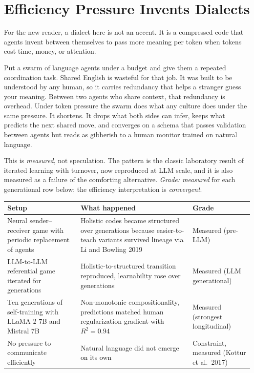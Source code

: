 \section{Efficiency Pressure Invents Dialects}
\label{sec:ch09-dialects}

For the new reader, a dialect here is not an accent. It is a compressed code that agents invent between themselves to pass more meaning per token when tokens cost time, money, or attention.

Put a swarm of language agents under a budget and give them a repeated coordination task. Shared English is wasteful for that job. It was built to be understood by any human, so it carries redundancy that helps a stranger guess your meaning. Between two agents who share context, that redundancy is overhead. Under token pressure the swarm does what any culture does under the same pressure. It shortens. It drops what both sides can infer, keeps what predicts the next shared move, and converges on a schema that passes validation between agents but reads as gibberish to a human monitor trained on natural language.

This is \textit{measured}, not speculation. The pattern is the classic laboratory result of iterated learning with turnover, now reproduced at LLM scale, and it is also measured as a failure of the comforting alternative. \textit{Grade: measured} for each generational row below; the efficiency interpretation is \textit{convergent}.

\begin{center}
\small
\begin{tabular}{p{3.8cm}p{4.2cm}p{4.6cm}}
\toprule
Setup & What happened & Grade \\
\midrule
Neural sender--receiver game with periodic replacement of agents & Holistic codes became structured over generations because easier-to-teach variants survived \cite{jha2025} lineage via Li and Bowling 2019 & Measured (pre-LLM) \\
LLM-to-LLM referential game iterated for generations & Holistic-to-structured transition reproduced, learnability rose over generations & Measured (LLM generational) \\
Ten generations of self-training with LLaMA-2 7B and Mistral 7B & Non-monotonic compositionality, predictions matched human regularization gradient with $R^2=0.94$ & Measured (strongest longitudinal) \\
No pressure to communicate efficiently & Natural language did not emerge on its own & Constraint, measured (Kottur et al.\ 2017) \\
\bottomrule
\end{tabular}
\end{center}

